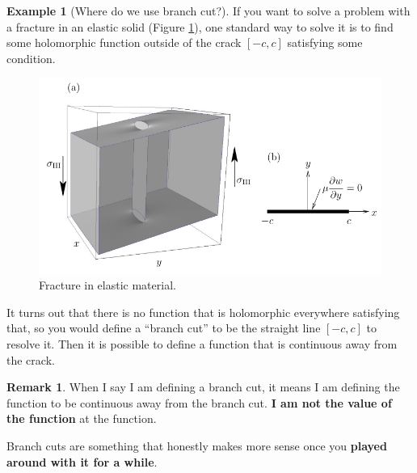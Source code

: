 \documentclass[a4paper, 12pt]{article}
\theoremstyle{definition}
\newtheorem{example}{Example}
\newtheorem{remark}{Remark}
\numberwithin{theorem}{section}
\numberwithin{definition}{section}
\numberwithin{exercise}{section}
\numberwithin{remark}{section}
\numberwithin{figure}{section}
\numberwithin{example}{section}
\begin{document}
\begin{example}[Where do we use branch cut?]
If you want to solve a problem with a fracture in an elastic solid (Figure \ref{fig: Crack Tip}),
one standard way to solve it is to find some holomorphic function outside of the crack $\left[ -c,c \right]$
satisfying some condition.
\begin{figure}[tbp]
    \centering
    \includegraphics[scale=.5]{crackTip}
    \caption{Fracture in elastic material.}
    \label{fig: Crack Tip}
\end{figure}
It turns out that there is no function that is holomorphic everywhere satisfying that,
so you would define a ``branch cut'' to be the straight line $\left[ -c,c \right]$ to resolve it.
Then it is possible to define a function that is continuous away from the crack.
\end{example}

\begin{remark}
    When I say I am defining a branch cut,
    it means I am defining the function to be continuous away from the branch cut.
    \textbf{I am not the value of the function} at the function.
\end{remark}

Branch cuts are something that honestly makes more sense once you \textbf{played around with it for a while}.
\end{document}
